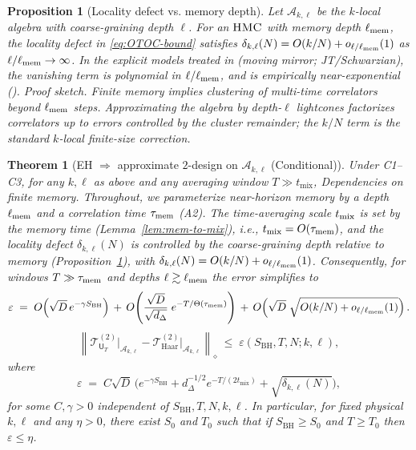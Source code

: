 \documentclass[a4paper,11pt]{article}
\newcommand{\HMC}{\textsc{HMC}\xspace}
\theoremstyle{plain}
\newtheorem{theorem}{Theorem}
\newtheorem{proposition}{Proposition}
\theoremstyle{definition}
\theoremstyle{remark}
\begin{document}
\begin{proposition}[Locality defect vs. memory depth]
\label{prop:delta-locality}
Let $\mathscr A_{k,\ell}$ be the $k$-local algebra with coarse-graining depth $\ell$. For an $\HMC{}$ with memory depth $\ell_{\rm mem}$,
the locality defect in \eqref{eq:OTOC-bound} satisfies $\delta_{k,\ell}(N)=O(k/N)+o_{\ell/\ell_{\rm mem}}(1)$ as $\ell/\ell_{\rm mem}\to\infty$.
In the explicit models treated in  (moving mirror; JT/Schwarzian), the vanishing term is polynomial in $\ell/\ell_{\rm mem}$,
and is empirically near-exponential ().
\emph{Proof sketch.} Finite memory implies clustering of multi-time correlators beyond $\ell_{\rm mem}$ steps.
Approximating the algebra by depth-$\ell$ lightcones factorizes correlators up to errors controlled by the cluster remainder;
the $k/N$ term is the standard $k$-local finite-size correction.
\end{proposition}

\begin{theorem}[EH $\Rightarrow$ approximate $2$-design on $\mathscr{A}_{k,\ell}$ (Conditional)]\label{thm:EH-2design}
Under C1--C3, for any $k,\ell$ as above and any averaging window $T\gg t_{\mathrm{mix}}$,
\noindent\emph{Dependencies on finite memory.} Throughout, we parameterize near-horizon memory by a depth $\ell_{\rm mem}$ and a correlation time $\tau_{\rm mem}$ (A2).
The time-averaging scale $t_{\rm mix}$ is set by the memory time (Lemma~\ref{lem:mem-to-mix}), i.e., $t_{\rm mix}=O(\tau_{\rm mem})$,
and the locality defect $\delta_{k,\ell}(N)$ is controlled by the coarse-graining depth relative to memory (Proposition~\ref{prop:delta-locality}),
with $\delta_{k,\ell}(N)=O(k/N)+o_{\ell/\ell_{\rm mem}}(1)$.
Consequently, for windows $T\gg \tau_{\rm mem}$ and depths $\ell\gtrsim \ell_{\rm mem}$ the error simplifies to
\begin{equation}
 \varepsilon \;=\; O\!\left( \sqrt{D}\,e^{-\gamma S_{\mathrm{BH}}} \right)
 \, +\, O\!\left( \frac{\sqrt{D}}{\sqrt{d_\Delta}}\; e^{-T/\Theta(\tau_{\rm mem})} \right)
 \, +\, O\!\left( \sqrt{D}\;\sqrt{O(k/N)+o_{\ell/\ell_{\rm mem}}(1)} \right).
\end{equation}
\begin{equation}\label{eq:main-eps}
 \left\| \mathcal{T}^{(2)}_{\mathsf{U}_T}\big|_{\mathscr{A}_{k,\ell}} - \mathcal{T}^{(2)}_{\mathrm{Haar}}\big|_{\mathscr{A}_{k,\ell}} \right\|_{\diamond}
 \;\le\; \varepsilon(S_{\mathrm{BH}},T,N;k,\ell),
\end{equation}
where
\begin{equation}
 \varepsilon \;=\; C \sqrt{D}\,\Big( e^{-\gamma S_{\mathrm{BH}}}
 + d_\Delta^{-1/2} e^{-T/(2t_{\mathrm{mix}})} + \sqrt{\delta_{k,\ell}(N)} \Big),
\end{equation}
for some $C,\gamma>0$ independent of $S_{\mathrm{BH}},T,N,k,\ell$.  In particular, for fixed physical $k,\ell$ and any $\eta>0$, there exist $S_0$ and $T_0$ such that if $S_{\mathrm{BH}}\ge S_0$ and $T\ge T_0$ then $\varepsilon\le \eta$.
\end{theorem}
\end{document}
